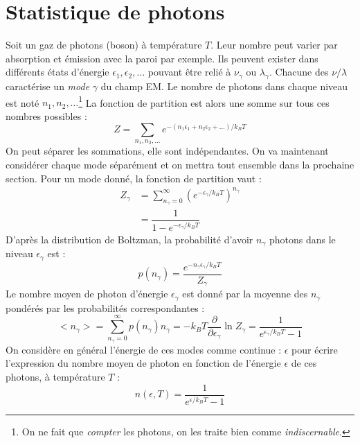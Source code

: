 \documentclass	[11pt, a4paper, openany]{book}
\begin{document}
\section{Statistique de photons}
Soit un gaz de photons (boson) à température $T$. Leur nombre peut varier par absorption et émission avec
la paroi par exemple. Ils peuvent exister dans différents états d'énergie $\epsilon_1,\epsilon_2,\dots$ 
pouvant être relié à $\nu_\gamma$ ou $\lambda_\gamma$. Chacune des $\nu/\lambda$ caractérise un 
\textit{mode} $\gamma$ du champ EM. Le nombre de photons dans chaque niveau est noté $n_1,n_2,\dots$\footnote{
On ne fait que \textit{compter} les photons, on les traite bien comme \textit{indiscernable}.} La 
fonction de partition est alors une somme sur tous ces nombres possibles :
\begin{equation}
Z = \sum_{n_1,n_2,\dots} e^{-(n_1\epsilon_1 + n_2\epsilon_2 + \dots)/k_BT}
\end{equation}
On peut séparer les sommations, elle sont indépendantes. On va maintenant considérer chaque mode 
séparément et on mettra tout ensemble dans la prochaine section. Pour un mode donné, la fonction de 
partition vaut :
\begin{equation}
\begin{array}{ll}
Z_\gamma &= \sum_{n_\gamma=0}^\infty \left(e^{-\epsilon_\gamma/k_BT}\right)^{n_\gamma}\\
 &= \dfrac{1}{1-e^{-\epsilon_\gamma/k_BT}}
\end{array}
\end{equation}
D'après la distribution de Boltzman, la probabilité d'avoir $n_\gamma$ photons dans le niveau
$\epsilon_\gamma$ est :
\begin{equation}
p(n_\gamma) = \dfrac{e^{-n_\gamma\epsilon_\gamma/k_BT}}{Z_\gamma}
\end{equation}
Le nombre moyen de photon d'énergie $\epsilon_\gamma$ est donné par la moyenne des $n_\gamma$ 
pondérés par les probabilités correspondantes :
\begin{equation}
<n_\gamma> = \sum_{n_\gamma = 0}^\infty p(n_\gamma)n_\gamma = -k_BT\dfrac{\partial}{\partial\epsilon_
\gamma}\ln Z_\gamma = \dfrac{1}{e^{\epsilon_\gamma/k_BT}-1}
\end{equation}
On considère en général l'énergie de ces modes comme continue : $\epsilon$ pour écrire l'expression du
nombre moyen de photon en fonction de l'énergie $\epsilon$ de ces photons, à température $T$ :
\begin{equation}
n(\epsilon,T) = \dfrac{1}{e^{\epsilon/k_BT}-1}
\end{equation}
\end{document}
